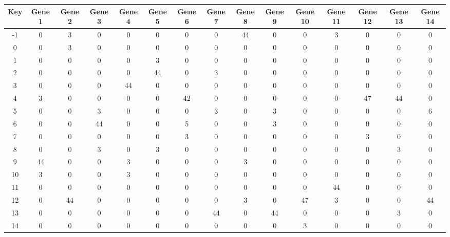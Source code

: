\begin{tabular}{|c|c|c|c|c|c|c|c|c|c|c|c|c|c|c|}
\hline
Key & Gene 1 & Gene 2 & Gene 3 & Gene 4 & Gene 5 & Gene 6 & Gene 7 & Gene 8 & Gene 9 & Gene 10 & Gene 11 & Gene 12 & Gene 13 & Gene 14 \\
\hline
-1 & 0 & 3 & 0 & 0 & 0 & 0 & 0 & 44 & 0 & 0 & 3 & 0 & 0 & 0 \\
0 & 0 & 3 & 0 & 0 & 0 & 0 & 0 & 0 & 0 & 0 & 0 & 0 & 0 & 0 \\
1 & 0 & 0 & 0 & 0 & 3 & 0 & 0 & 0 & 0 & 0 & 0 & 0 & 0 & 0 \\
2 & 0 & 0 & 0 & 0 & 44 & 0 & 3 & 0 & 0 & 0 & 0 & 0 & 0 & 0 \\
3 & 0 & 0 & 0 & 44 & 0 & 0 & 0 & 0 & 0 & 0 & 0 & 0 & 0 & 0 \\
4 & 3 & 0 & 0 & 0 & 0 & 42 & 0 & 0 & 0 & 0 & 0 & 47 & 44 & 0 \\
5 & 0 & 0 & 3 & 0 & 0 & 0 & 3 & 0 & 3 & 0 & 0 & 0 & 0 & 6 \\
6 & 0 & 0 & 44 & 0 & 0 & 5 & 0 & 0 & 3 & 0 & 0 & 0 & 0 & 0 \\
7 & 0 & 0 & 0 & 0 & 0 & 3 & 0 & 0 & 0 & 0 & 0 & 3 & 0 & 0 \\
8 & 0 & 0 & 3 & 0 & 3 & 0 & 0 & 0 & 0 & 0 & 0 & 0 & 3 & 0 \\
9 & 44 & 0 & 0 & 3 & 0 & 0 & 0 & 3 & 0 & 0 & 0 & 0 & 0 & 0 \\
10 & 3 & 0 & 0 & 3 & 0 & 0 & 0 & 0 & 0 & 0 & 0 & 0 & 0 & 0 \\
11 & 0 & 0 & 0 & 0 & 0 & 0 & 0 & 0 & 0 & 0 & 44 & 0 & 0 & 0 \\
12 & 0 & 44 & 0 & 0 & 0 & 0 & 0 & 3 & 0 & 47 & 3 & 0 & 0 & 44 \\
13 & 0 & 0 & 0 & 0 & 0 & 0 & 44 & 0 & 44 & 0 & 0 & 0 & 3 & 0 \\
14 & 0 & 0 & 0 & 0 & 0 & 0 & 0 & 0 & 0 & 3 & 0 & 0 & 0 & 0 \\
\hline
\end{tabular}